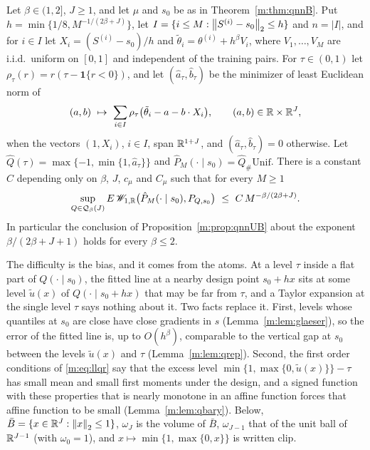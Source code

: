 \begin{proposition}\label{m:prop:qnnUB2}
Let $\beta\in(1,2]$, $J\ge1$, and let $\mu$ and $s_0$ be as in Theorem~\ref{m:thm:qnnB}. Put $h=\min\{1/8,M^{-1/(2\beta+J)}\}$, let $I=\{i\le M:\left\|S^{(i)}-s_0\right\|_2\le h\}$ and $n=|I|$, and for $i\in I$ let $X_i=(S^{(i)}-s_0)/h$ and $\tilde\theta_i=\theta^{(i)}+h^\beta V_i$, where $V_1,\dots,V_M$ are i.i.d.\ uniform on $[0,1]$ and independent of the training pairs. For $\tau\in(0,1)$ let $\rho_\tau(r)=r(\tau-\mathbf 1\{r<0\})$, and let $(\hat a_\tau,\hat b_\tau)$ be the minimizer of least Euclidean norm of
\begin{equation}\label{m:eq:llqr}
(a,b)\ \mapsto\ \sum_{i\in I}\rho_\tau\big(\tilde\theta_i-a-b\cdot X_i\big),\qquad(a,b)\in\mathbb{R}\times\mathbb{R}^J,
\end{equation}
when the vectors $(1,X_i)$, $i\in I$, span $\mathbb{R}^{1+J}$, and $(\hat a_\tau,\hat b_\tau)=0$ otherwise. Let $\hat Q(\tau)=\max\{-1,\min\{1,\hat a_\tau\}\}$ and $\hat P_M(\cdot\mid s_0)=\hat Q_\#\mathrm{Unif}$. There is a constant $C$ depending only on $\beta$, $J$, $c_\mu$ and $C_\mu$ such that for every $M\ge1$
\[
\sup_{Q\in\mathcal Q_\beta(J)}E\,\Wone_{1,\R}\big(\hat P_M(\cdot\mid s_0),P_{Q,s_0}\big)\ \le\ C\,M^{-\beta/(2\beta+J)} .
\]
In particular the conclusion of Proposition~\ref{m:prop:qnnUB} about the exponent $\beta/(2\beta+J+1)$ holds for every $\beta\le2$.
\end{proposition}

The difficulty is the bias, and it comes from the atoms. At a level $\tau$ inside a flat part of $Q(\cdot\mid s_0)$, the fitted line at a nearby design point $s_0+hx$ sits at some level $\tilde u(x)$ of $Q(\cdot\mid s_0+hx)$ that may be far from $\tau$, and a Taylor expansion at the single level $\tau$ says nothing about it. Two facts replace it. First, levels whose quantiles at $s_0$ are close have close gradients in $s$ (Lemma~\ref{m:lem:glaeser}), so the error of the fitted line is, up to $O(h^\beta)$, comparable to the vertical gap at $s_0$ between the levels $\tilde u(x)$ and $\tau$ (Lemma~\ref{m:lem:qrep}). Second, the first order conditions of \eqref{m:eq:llqr} say that the excess level $\min\{1,\max\{0,\tilde u(x)\}\}-\tau$ has small mean and small first moments under the design, and a signed function with these properties that is nearly monotone in an affine function forces that affine function to be small (Lemma~\ref{m:lem:qbary}). Below, $\bar B=\{x\in\mathbb{R}^J:\left\|x\right\|_2\le1\}$, $\omega_J$ is the volume of $\bar B$, $\omega_{J-1}$ that of the unit ball of $\mathbb{R}^{J-1}$ (with $\omega_0=1$), and $x\mapsto\min\{1,\max\{0,x\}\}$ is written $\mathrm{clip}$.

